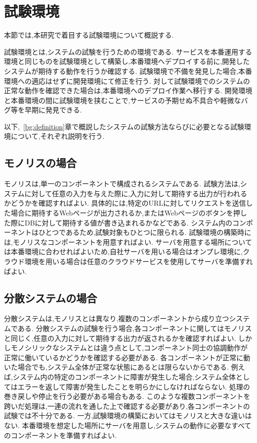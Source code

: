 \section{試験環境}
\label{bg:staging}

本節では,本研究で着目する試験環境について概説する.

試験環境とは,システムの試験を行うための環境である.
サービスを本番運用する環境と同じものを試験環境として構築し,本番環境へデプロイする前に,開発したシステムが期待する動作を行うか確認する.
試験環境で不備を発見した場合,本番環境への適応はせずに開発環境にて修正を行う.
対して試験環境でのシステムの正常な動作を確認できた場合は,本番環境へのデプロイ作業へ移行する.
開発環境と本番環境の間に試験環境を挟むことで,サービスの予期せぬ不具合や軽微なバグ等を早期に発見できる.

以下,~\ref{bg:definition}章で概説したシステムの試験方法ならびに必要となる試験環境について,それぞれ説明を行う.

\subsection{モノリスの場合}
\label{bg:staging:monolith}

モノリスは,単一のコンポーネントで構成されるシステムである.
試験方法は,システムに対して任意の入力を与えた際に,入力に対して期待する出力が行われるかどうかを確認すればよい.
具体的には,特定のURLに対してリクエストを送信した場合に期待するWebページが出力されるか,またはWebページのボタンを押した際にDBに対して期待する値が書き込まれるかなどである.
システム内のコンポーネントはひとつであるため,試験対象もひとつに限られる.
試験環境の構築時には,モノリスなコンポーネントを用意すればよい.
サーバを用意する場所については本番環境に合わせればよいため,自社サーバを用いる場合はオンプレ環境に,クラウド環境を用いる場合は任意のクラウドサービスを使用してサーバを準備すればよい.

\subsection{分散システムの場合}
\label{bg:staging:distributed-system}

分散システムは,モノリスとは異なり,複数のコンポーネントから成り立つシステムである.
分散システムの試験を行う場合,各コンポーネントに関してはモノリスと同じく,任意の入力に対して期待する出力が返されるかを確認すればよい.
しかしモノシリックなシステムとは違う点として,コンポーネント同士の協調動作が正常に働いているかどうかを確認する必要がある.
各コンポーネントが正常に動いた場合でも,システム全体が正常な状態にあるとは限らないからである.
例えば,システム内の特定のコンポーネントに障害が発生した場合,システム全体としてはエラーを返して障害が発生したことを明らかにしなければならない.
処理の巻き戻しや停止を行う必要がある場合もある.
このような複数コンポーネントを跨いだ処理は,一連の流れを通した上で確認する必要があり,各コンポーネントの試験では不十分である.
一方,試験環境の構築においてはモノリスと大きな違いはない.
本番環境を想定した場所にサーバを用意し,システムの動作に必要なすべてのコンポーネントを準備すればよい.

